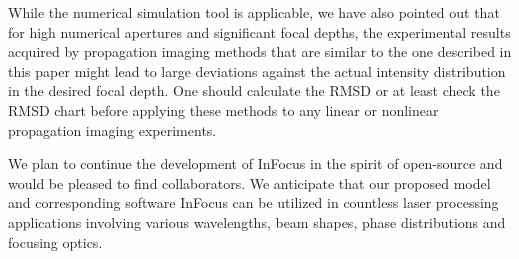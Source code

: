 \documentclass[9pt,twocolumn,twoside]{osajnl}
\begin{document}
While the numerical simulation tool is applicable, we have also pointed out that for high numerical apertures and significant focal depths, the experimental results acquired by propagation imaging methods that are similar to the one described in this paper might lead to large deviations against the actual intensity distribution in the desired focal depth. One should calculate the RMSD or at least check the RMSD chart before applying these methods to any linear or nonlinear propagation imaging experiments. 

We plan to continue the development of InFocus \cite{InFocus} in the spirit of open-source and would be pleased to find collaborators. We anticipate that our proposed model and corresponding software InFocus can be utilized in countless laser processing applications involving various wavelengths, beam shapes, phase distributions and focusing optics.








\appendix
\end{document}
